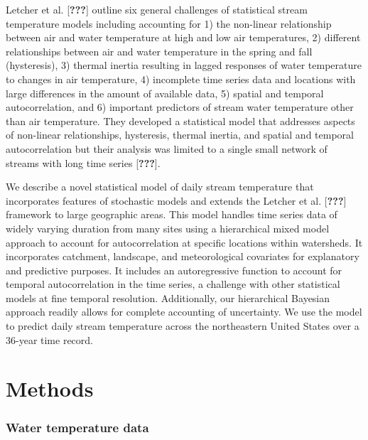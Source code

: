 Letcher et al. {[}{\textbf{???}}{]} outline six general challenges of
statistical stream temperature models including accounting for 1) the
non-linear relationship between air and water temperature at high and
low air temperatures, 2) different relationships between air and water
temperature in the spring and fall (hysteresis), 3) thermal inertia
resulting in lagged responses of water temperature to changes in air
temperature, 4) incomplete time series data and locations with large
differences in the amount of available data, 5) spatial and temporal
autocorrelation, and 6) important predictors of stream water temperature
other than air temperature. They developed a statistical model that
addresses aspects of non-linear relationships, hysteresis, thermal
inertia, and spatial and temporal autocorrelation but their analysis was
limited to a single small network of streams with long time series
{[}{\textbf{???}}{]}.

We describe a novel statistical model of daily stream temperature that
incorporates features of stochastic models and extends the Letcher et
al. {[}{\textbf{???}}{]} framework to large geographic areas. This model
handles time series data of widely varying duration from many sites
using a hierarchical mixed model approach to account for autocorrelation
at specific locations within watersheds. It incorporates catchment,
landscape, and meteorological covariates for explanatory and predictive
purposes. It includes an autoregressive function to account for temporal
autocorrelation in the time series, a challenge with other statistical
models at fine temporal resolution. Additionally, our hierarchical
Bayesian approach readily allows for complete accounting of uncertainty.
We use the model to predict daily stream temperature across the
northeastern United States over a 36-year time record.

\section{Methods}\label{methods}

\subsubsection{Water temperature data}\label{water-temperature-data}

